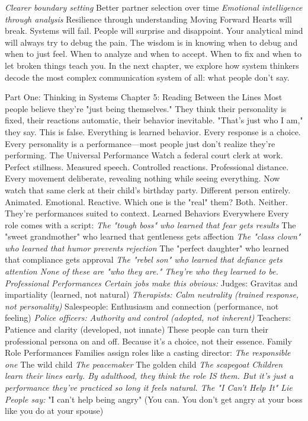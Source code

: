 \documentclass[12pt]{book}
\begin{document}
\textit{ Clearer boundary setting
} Better partner selection over time
\textit{ Emotional intelligence through analysis
} Resilience through understanding
Moving Forward
Hearts will break. Systems will fail. People will surprise and disappoint. Your analytical mind will always try to debug the pain.
The wisdom is in knowing when to debug and when to just feel. When to analyze and when to accept. When to fix and when to let broken things teach you.
In the next chapter, we explore how system thinkers decode the most complex communication system of all: what people don't say.



Part One: Thinking in Systems
Chapter 5: Reading Between the Lines
Most people believe they're "just being themselves." They think their personality is fixed, their reactions automatic, their behavior inevitable. "That's just who I am," they say.
This is false. Everything is learned behavior. Every response is a choice. Every personality is a performance—most people just don't realize they're performing.
The Universal Performance
Watch a federal court clerk at work. Perfect stillness. Measured speech. Controlled reactions. Professional distance. Every movement deliberate, revealing nothing while seeing everything.
Now watch that same clerk at their child's birthday party. Different person entirely. Animated. Emotional. Reactive.
Which one is the "real" them? Both. Neither. They're performances suited to context.
Learned Behaviors Everywhere
Every role comes with a script:
\textit{ The "tough boss" who learned that fear gets results
} The "sweet grandmother" who learned that gentleness gets affection
\textit{ The "class clown" who learned that humor prevents rejection
} The "perfect daughter" who learned that compliance gets approval
\textit{ The "rebel son" who learned that defiance gets attention
None of these are "who they are." They're who they learned to be.
Professional Performances
Certain jobs make this obvious:
} Judges: Gravitas and impartiality (learned, not natural)
\textit{ Therapists: Calm neutrality (trained response, not personality)
} Salespeople: Enthusiasm and connection (performance, not feeling)
\textit{ Police officers: Authority and control (adopted, not inherent)
} Teachers: Patience and clarity (developed, not innate)
These people can turn their professional persona on and off. Because it's a choice, not their essence.
Family Role Performances
Families assign roles like a casting director:
\textit{ The responsible one
} The wild child
\textit{ The peacemaker
} The golden child
\textit{ The scapegoat
Children learn their lines early. By adulthood, they think the role IS them. But it's just a performance they've practiced so long it feels natural.
The "I Can't Help It" Lie
People say:
} "I can't help being angry" (You can. You don't get angry at your boss like you do at your spouse)
\end{document}
